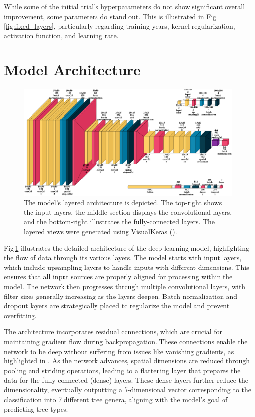 While some of the initial trial's hyperparameters do not show significant overall improvement, some parameters do stand out. This is illustrated in Fig\,\ref{fig:fixed_layers}, particularly regarding training years, kernel regularization, activation function, and learning rate.

\section{Model Architecture}

\begin{figure}[ht]
    \centering
    \includegraphics[width=0.9\linewidth]{figures/figures_tuner/model_layered_view.png}
    \caption{The model's layered architecture is depicted. The top-right shows the input layers, the middle section displays the convolutional layers, and the bottom-right illustrates the fully-connected layers. The layered views were generated using VisualKeras (\cite{visualkeras}).}
    \label{fig:model_layered_view}
\end{figure}

Fig\,\ref{fig:model_layered_view} illustrates the detailed architecture of the deep learning model, highlighting the flow of data through its various layers. The model starts with input layers, which include upsampling layers to handle inputs with different dimensions. This ensures that all input sources are properly aligned for processing within the model. The network then progresses through multiple convolutional layers, with filter sizes generally increasing as the layers deepen. Batch normalization and dropout layers are strategically placed to regularize the model and prevent overfitting.

The architecture incorporates residual connections, which are crucial for maintaining gradient flow during backpropagation. These connections enable the network to be deep without suffering from issues like vanishing gradients, as highlighted in \cite{resnet}. As the network advances, spatial dimensions are reduced through pooling and striding operations, leading to a flattening layer that prepares the data for the fully connected (dense) layers. These dense layers further reduce the dimensionality, eventually outputting a 7-dimensional vector corresponding to the classification into 7 different tree genera, aligning with the model's goal of predicting tree types.

